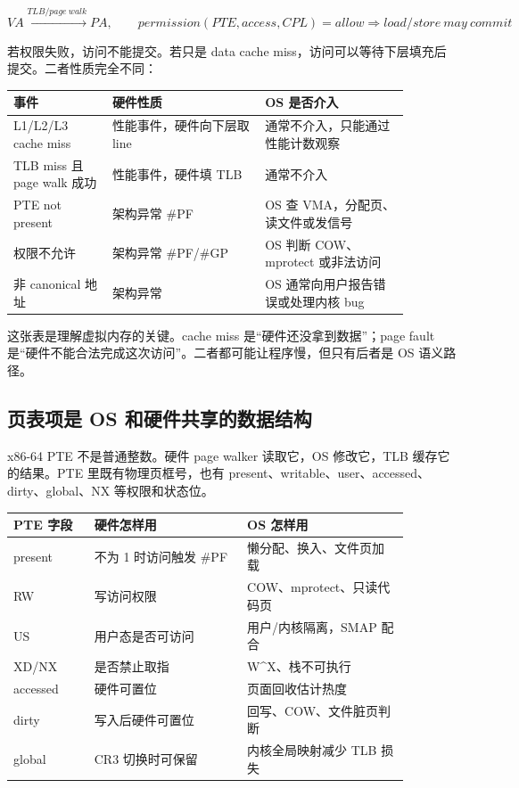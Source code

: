 \[
VA \xrightarrow{TLB/page\ walk} PA,\qquad
permission(PTE, access, CPL)=allow
\Rightarrow load/store\ may\ commit
\]

若权限失败，访问不能提交。若只是 data cache miss，访问可以等待下层填充后提交。二者性质完全不同：

\begin{longtable}{p{0.22\linewidth}p{0.34\linewidth}p{0.32\linewidth}}
\toprule
事件 & 硬件性质 & OS 是否介入 \\
\midrule
L1/L2/L3 cache miss & 性能事件，硬件向下层取 line & 通常不介入，只能通过性能计数观察 \\
TLB miss 且 page walk 成功 & 性能事件，硬件填 TLB & 通常不介入 \\
PTE not present & 架构异常 \#PF & OS 查 VMA，分配页、读文件或发信号 \\
权限不允许 & 架构异常 \#PF/\#GP & OS 判断 COW、mprotect 或非法访问 \\
非 canonical 地址 & 架构异常 & OS 通常向用户报告错误或处理内核 bug \\
\bottomrule
\end{longtable}

这张表是理解虚拟内存的关键。cache miss 是“硬件还没拿到数据”；page fault 是“硬件不能合法完成这次访问”。二者都可能让程序慢，但只有后者是 OS 语义路径。

\subsection{页表项是 OS 和硬件共享的数据结构}

x86-64 PTE 不是普通整数。硬件 page walker 读取它，OS 修改它，TLB 缓存它的结果。PTE 里既有物理页框号，也有 present、writable、user、accessed、dirty、global、NX 等权限和状态位。

\begin{longtable}{p{0.18\linewidth}p{0.34\linewidth}p{0.36\linewidth}}
\toprule
PTE 字段 & 硬件怎样用 & OS 怎样用 \\
\midrule
present & 不为 1 时访问触发 \#PF & 懒分配、换入、文件页加载 \\
RW & 写访问权限 & COW、mprotect、只读代码页 \\
US & 用户态是否可访问 & 用户/内核隔离，SMAP 配合 \\
XD/NX & 是否禁止取指 & W\textasciicircum X、栈不可执行 \\
accessed & 硬件可置位 & 页面回收估计热度 \\
dirty & 写入后硬件可置位 & 回写、COW、文件脏页判断 \\
global & CR3 切换时可保留 & 内核全局映射减少 TLB 损失 \\
\bottomrule
\end{longtable}


